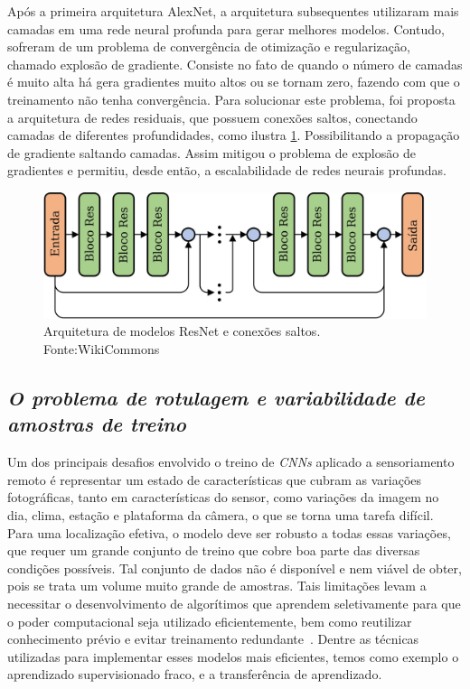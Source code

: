 Após a primeira arquitetura AlexNet, a arquitetura subsequentes utilizaram mais camadas em uma rede neural profunda para gerar melhores modelos. Contudo, sofreram de um problema de convergência de otimização e regularização, chamado explosão de gradiente. Consiste no fato de quando o número de camadas é muito alta há gera gradientes muito altos ou se tornam zero, fazendo com que o treinamento não tenha convergência. 
Para solucionar este problema, foi proposta a arquitetura de redes residuais, que possuem conexões saltos, conectando camadas de diferentes profundidades, como ilustra \ref{fig:ResNet-Rsp}. Possibilitando a propagação de gradiente saltando camadas. Assim mitigou o problema de explosão de gradientes e permitiu, desde então, a escalabilidade de redes neurais profundas. 


\begin{figure}[!ht]
    \centering
    \includegraphics[width=0.9\columnwidth]{Imagens/An-illustration-of-the-deep-residual-network-ResNet-structure-More-shortcut.jpg}
    \caption{ Arquitetura de modelos ResNet e conexões saltos. Fonte:WikiCommons}
   \label{fig:ResNet-Rsp}
\end{figure}


\subsection{\textit{O problema de rotulagem e variabilidade de amostras de treino}}\label{sec:Cap2_rotulagem}

Um dos principais desafios envolvido o treino de \textit{CNNs} aplicado a sensoriamento remoto é representar um estado de características que cubram as variações fotográficas, tanto em características do sensor, como variações da imagem no dia, clima, estação e plataforma da câmera, o que se torna uma tarefa difícil. Para uma localização efetiva, o modelo deve ser robusto a todas essas variações, que requer um grande conjunto de treino que cobre boa parte das diversas condições possíveis. Tal conjunto de dados não é disponível e nem viável de obter, pois se trata um volume muito grande de amostras. Tais limitações levam a necessitar o desenvolvimento de algorítimos que aprendem seletivamente para que o poder computacional seja utilizado eficientemente, bem como reutilizar conhecimento prévio e evitar treinamento redundante~\cite{rostami2019learning}.  Dentre as técnicas utilizadas para implementar esses modelos mais eficientes, temos como exemplo o aprendizado supervisionado fraco, e a transferência de aprendizado.


